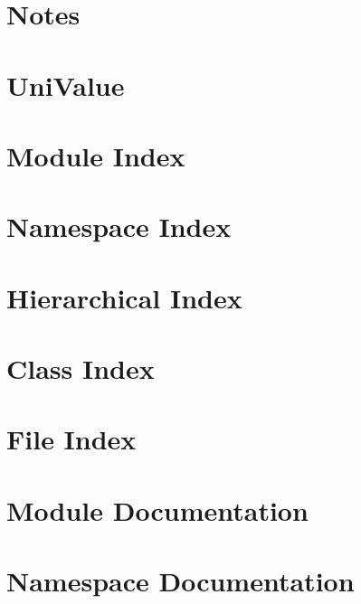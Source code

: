 \documentclass[twoside]{book}
\newcommand{\+}{\discretionary{\mbox{\scriptsize$\hookleftarrow$}}{}{}}
\begin{document}
\chapter{Notes}
\label{md__p_i_v_x_src_test__r_e_a_d_m_e}

\chapter{Uni\+Value}
\label{md__p_i_v_x_src_univalue__r_e_a_d_m_e}

\chapter{Module Index}

\chapter{Namespace Index}

\chapter{Hierarchical Index}

\chapter{Class Index}

\chapter{File Index}

\chapter{Module Documentation}


\chapter{Namespace Documentation}






\end{document}

